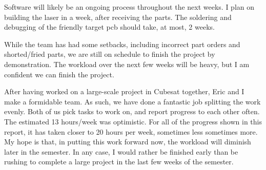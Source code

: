 \documentclass[letterpaper,10pt]{article}
\begin{document}
\begin{spacing}{1.15}
Software will likely be an ongoing process throughout the next weeks. I plan on building the laser in a week, after receiving the parts. The soldering and debugging of the friendly target pcb should take, at most, 2 weeks. 

While the team has had some setbacks, including incorrect part orders and shorted/fried parts, we are still on schedule to finish the project by demonstration. The workload over the next few weeks will be heavy, but I am confident we can finish the project. 

After having worked on a large-scale project in Cubesat together, Eric and I make a formidable team. As such, we have done a fantastic job splitting the work evenly. Both of us pick tasks to work on, and report progress to each other often. The estimated 13 hours/week was optimistic. For all of the progress shown in this report, it has taken closer to 20 hours per week, sometimes less sometimes more. My hope is that, in putting this work forward now, the workload will diminish later in the semester. In any case, I would rather be finished early than be rushing to complete a large project in the last few weeks of the semester. 



\end{spacing}
\end{document}
